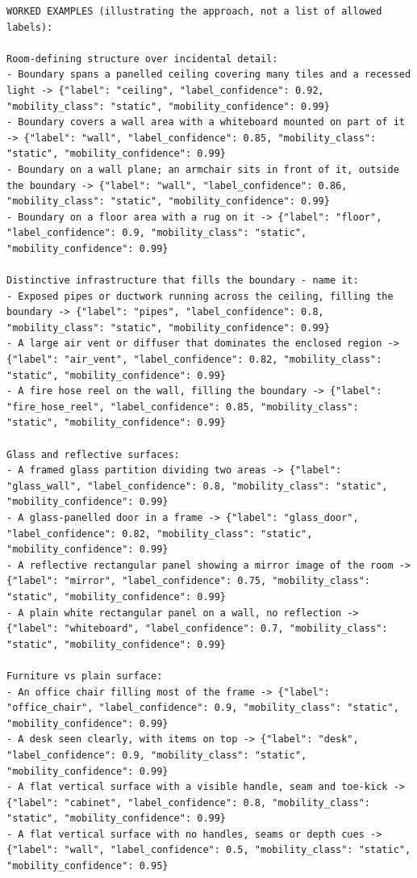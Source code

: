 \begin{lstlisting}[style=promptstyle]
WORKED EXAMPLES (illustrating the approach, not a list of allowed labels):

Room-defining structure over incidental detail:
- Boundary spans a panelled ceiling covering many tiles and a recessed light -> {"label": "ceiling", "label_confidence": 0.92, "mobility_class": "static", "mobility_confidence": 0.99}
- Boundary covers a wall area with a whiteboard mounted on part of it -> {"label": "wall", "label_confidence": 0.85, "mobility_class": "static", "mobility_confidence": 0.99}
- Boundary on a wall plane; an armchair sits in front of it, outside the boundary -> {"label": "wall", "label_confidence": 0.86, "mobility_class": "static", "mobility_confidence": 0.99}
- Boundary on a floor area with a rug on it -> {"label": "floor", "label_confidence": 0.9, "mobility_class": "static", "mobility_confidence": 0.99}

Distinctive infrastructure that fills the boundary - name it:
- Exposed pipes or ductwork running across the ceiling, filling the boundary -> {"label": "pipes", "label_confidence": 0.8, "mobility_class": "static", "mobility_confidence": 0.99}
- A large air vent or diffuser that dominates the enclosed region -> {"label": "air_vent", "label_confidence": 0.82, "mobility_class": "static", "mobility_confidence": 0.99}
- A fire hose reel on the wall, filling the boundary -> {"label": "fire_hose_reel", "label_confidence": 0.85, "mobility_class": "static", "mobility_confidence": 0.99}

Glass and reflective surfaces:
- A framed glass partition dividing two areas -> {"label": "glass_wall", "label_confidence": 0.8, "mobility_class": "static", "mobility_confidence": 0.99}
- A glass-panelled door in a frame -> {"label": "glass_door", "label_confidence": 0.82, "mobility_class": "static", "mobility_confidence": 0.99}
- A reflective rectangular panel showing a mirror image of the room -> {"label": "mirror", "label_confidence": 0.75, "mobility_class": "static", "mobility_confidence": 0.99}
- A plain white rectangular panel on a wall, no reflection -> {"label": "whiteboard", "label_confidence": 0.7, "mobility_class": "static", "mobility_confidence": 0.99}

Furniture vs plain surface:
- An office chair filling most of the frame -> {"label": "office_chair", "label_confidence": 0.9, "mobility_class": "static", "mobility_confidence": 0.99}
- A desk seen clearly, with items on top -> {"label": "desk", "label_confidence": 0.9, "mobility_class": "static", "mobility_confidence": 0.99}
- A flat vertical surface with a visible handle, seam and toe-kick -> {"label": "cabinet", "label_confidence": 0.8, "mobility_class": "static", "mobility_confidence": 0.99}
- A flat vertical surface with no handles, seams or depth cues -> {"label": "wall", "label_confidence": 0.5, "mobility_class": "static", "mobility_confidence": 0.95}


\end{lstlisting}

